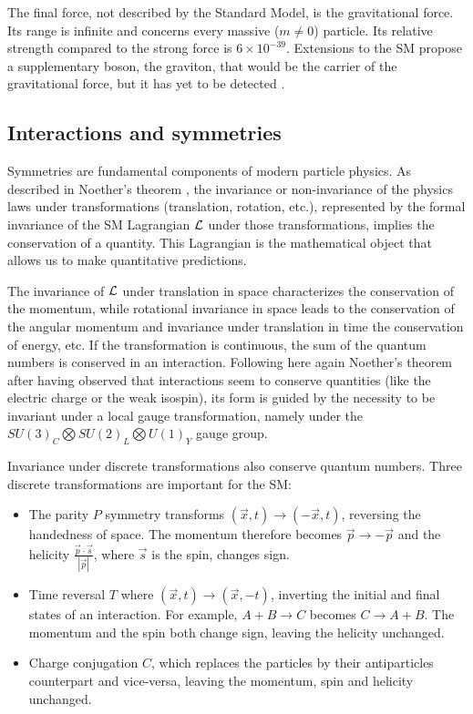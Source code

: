 \documentclass[../main.tex]{subfiles}
\begin{document}
The final force, not described by the Standard Model, is the gravitational force. Its range is infinite and concerns every massive ($m \neq 0$) particle. Its relative strength compared to the strong force is $6\times 10^{-39}$. Extensions to the SM propose a supplementary boson, the graviton, that would be the carrier of the gravitational force, but it has yet to be detected \cite{ParticleDataGroup:2024cfk, carney_graviton_2024}.

\subsection{Interactions and symmetries}

Symmetries are fundamental components of modern particle physics. As described in Noether's theorem \cite{noether_invariant_1971}, the invariance or non-invariance of the physics laws under transformations (translation, rotation, etc.), represented by the formal invariance of the SM Lagrangian ${\cal L}$ under those transformations, implies the conservation of a quantity.
This Lagrangian is the mathematical object that allows us to make quantitative predictions.

The invariance of ${\cal L}$ under translation in space characterizes the conservation of the momentum, while rotational invariance in space leads to the conservation of the angular momentum and invariance under translation in time the conservation of energy, etc. If the transformation is continuous, the sum of the quantum numbers is conserved in an interaction.
Following here again Noether's theorem after having observed that interactions seem to conserve quantities (like the electric charge or the weak isospin), its form is guided by the necessity to be invariant under a local gauge transformation, namely under the $SU(3)_C \bigotimes SU(2)_L \bigotimes U(1)_Y$ gauge group.

Invariance under discrete transformations also conserve quantum numbers. Three discrete transformations are important for the SM:
\begin{itemize}
  \item The parity $P$ symmetry transforms $(\vec{x}, t) \rightarrow (-\vec{x}, t)$, reversing the handedness of space. The momentum therefore becomes $\vec{p} \rightarrow -\vec{p}$ and the helicity $\frac{\vec{p} \cdot \vec{s}}{|\vec{p}|}$, where $\vec{s}$ is the spin, changes sign.

  \item Time reversal $T$ where $(\vec{x}, t) \rightarrow (\vec{x}, -t)$, inverting the initial and final states of an interaction. For example, $A + B \rightarrow C$ becomes $C \rightarrow A + B$. The momentum and the spin both change sign, leaving the helicity unchanged.

  \item Charge conjugation $C$, which replaces the particles by their antiparticles counterpart and vice-versa, leaving the momentum, spin and helicity unchanged.
\end{itemize}
\end{document}
